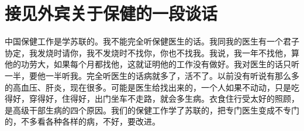 \section[接见外宾关于保健的一段谈话（一九六四年六月二十四日）]{接见外宾关于保健的一段谈话}


中国保健工作是学苏联的。我不能完全听保健医生的话。我同我的医生有一个君子协定，我发烧时请你，我不发烧时不找你，你也不找我。我说，我一年不找他，算他的功劳大，如果每个月都找他，这就证明他的工作没有做好。我对医生的话只听一半，要他一半听我。完全听医生的话病就多了，活不了。以前没有听说有那么多的高血压、肝炎，现在很多。可能是医生给找出来的，一个人如果不动动，只是吃得好，穿得好，住得好，出门坐车不走路，就会多生病。衣食住行受太好的照顾，是高级干部生病的四个原因。我们的保健工作学了苏联的，把专门医生变成不专门的，不多看各种各样的病，不好，要改进。

